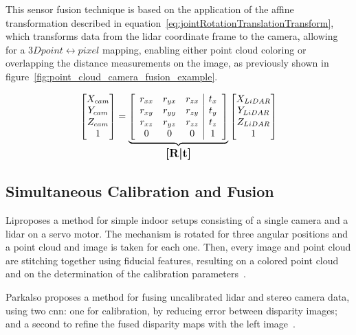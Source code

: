 This sensor fusion technique is based on the application of the affine transformation described in equation~\eqref{eq:jointRotationTranslationTransform}, which transforms data from the \ac{lidar} coordinate frame to the camera, allowing for a $3D point \leftrightarrow pixel$ mapping, enabling either point cloud coloring or overlapping the distance measurements on the image, as previously shown in figure~\ref{fig:point_cloud_camera_fusion_example}.
	
\begin{equation}
	\label{eq:jointRotationTranslationTransform}
	\begin{bmatrix}
		X_{cam} \\
		Y_{cam} \\
		Z_{cam} \\
		1
	\end{bmatrix}
	= 
		\underbrace{
	\left[
			\begin{array}{ccc|c}
				r_{xx} & r_{yx} & r_{zx} & t_x \\
					r_{xy} & r_{yy} & r_{zy} & t_y \\
					r_{xz} & r_{yz} & r_{zz} & t_z \\
					0      & 0      & 0      & 1 
				\end{array}
		\right]
		}_\text{\large\textbf{[R|t]}}
	\begin{bmatrix}
		X_{LiDAR} \\
		Y_{LiDAR} \\
		Z_{LiDAR} \\
		1
	\end{bmatrix}
\end{equation}


\subsection{Simultaneous Calibration and Fusion}
\label{subsec:sota:simultaneous-calibration-fusion}
Li\etal proposes a method for simple indoor setups consisting of a single camera and a \ac{lidar} on a servo motor. The mechanism is rotated for three angular positions and a point cloud and image is taken for each one. Then, every image and point cloud are stitching together using fiducial features, resulting on a colored point cloud and on the determination of the calibration parameters~\cite{Li2016}. 

Park\etal also proposes a method for fusing uncalibrated \ac{lidar} and stereo camera data, using two \ac{cnn}: one for calibration, by reducing error between disparity images; and a second to refine the fused disparity maps with the left image~\cite{Park2019}. 

